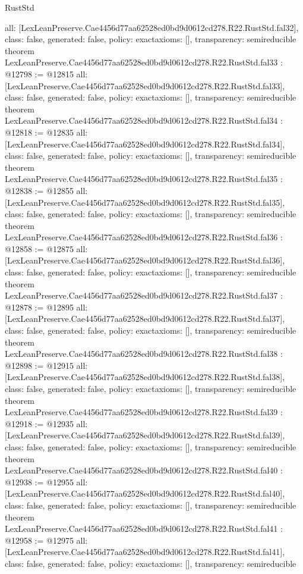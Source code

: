 \begin{lexlean}{RustStd}
\begin{coremodule}
{  all: [LexLeanPreserve.Cae4456d77aa62528ed0bd9d0612cd278.R22.RustStd.fal32],
  class: false,
  generated: false,
  policy: exact{axioms: []},
  transparency: semireducible
}
theorem LexLeanPreserve.Cae4456d77aa62528ed0bd9d0612cd278.R22.RustStd.fal33 : @12798 := @12815 {
  all: [LexLeanPreserve.Cae4456d77aa62528ed0bd9d0612cd278.R22.RustStd.fal33],
  class: false,
  generated: false,
  policy: exact{axioms: []},
  transparency: semireducible
}
theorem LexLeanPreserve.Cae4456d77aa62528ed0bd9d0612cd278.R22.RustStd.fal34 : @12818 := @12835 {
  all: [LexLeanPreserve.Cae4456d77aa62528ed0bd9d0612cd278.R22.RustStd.fal34],
  class: false,
  generated: false,
  policy: exact{axioms: []},
  transparency: semireducible
}
theorem LexLeanPreserve.Cae4456d77aa62528ed0bd9d0612cd278.R22.RustStd.fal35 : @12838 := @12855 {
  all: [LexLeanPreserve.Cae4456d77aa62528ed0bd9d0612cd278.R22.RustStd.fal35],
  class: false,
  generated: false,
  policy: exact{axioms: []},
  transparency: semireducible
}
theorem LexLeanPreserve.Cae4456d77aa62528ed0bd9d0612cd278.R22.RustStd.fal36 : @12858 := @12875 {
  all: [LexLeanPreserve.Cae4456d77aa62528ed0bd9d0612cd278.R22.RustStd.fal36],
  class: false,
  generated: false,
  policy: exact{axioms: []},
  transparency: semireducible
}
theorem LexLeanPreserve.Cae4456d77aa62528ed0bd9d0612cd278.R22.RustStd.fal37 : @12878 := @12895 {
  all: [LexLeanPreserve.Cae4456d77aa62528ed0bd9d0612cd278.R22.RustStd.fal37],
  class: false,
  generated: false,
  policy: exact{axioms: []},
  transparency: semireducible
}
theorem LexLeanPreserve.Cae4456d77aa62528ed0bd9d0612cd278.R22.RustStd.fal38 : @12898 := @12915 {
  all: [LexLeanPreserve.Cae4456d77aa62528ed0bd9d0612cd278.R22.RustStd.fal38],
  class: false,
  generated: false,
  policy: exact{axioms: []},
  transparency: semireducible
}
theorem LexLeanPreserve.Cae4456d77aa62528ed0bd9d0612cd278.R22.RustStd.fal39 : @12918 := @12935 {
  all: [LexLeanPreserve.Cae4456d77aa62528ed0bd9d0612cd278.R22.RustStd.fal39],
  class: false,
  generated: false,
  policy: exact{axioms: []},
  transparency: semireducible
}
theorem LexLeanPreserve.Cae4456d77aa62528ed0bd9d0612cd278.R22.RustStd.fal40 : @12938 := @12955 {
  all: [LexLeanPreserve.Cae4456d77aa62528ed0bd9d0612cd278.R22.RustStd.fal40],
  class: false,
  generated: false,
  policy: exact{axioms: []},
  transparency: semireducible
}
theorem LexLeanPreserve.Cae4456d77aa62528ed0bd9d0612cd278.R22.RustStd.fal41 : @12958 := @12975 {
  all: [LexLeanPreserve.Cae4456d77aa62528ed0bd9d0612cd278.R22.RustStd.fal41],
  class: false,
  generated: false,
  policy: exact{axioms: []},
  transparency: semireducible
}
\end{coremodule}
\end{lexlean}
